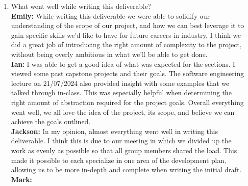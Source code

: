 \documentclass{article}
\begin{document}



\begin{enumerate}
    \item What went well while writing this deliverable? \\
    \textbf{Emily:} While writing this deliverable we were able to solidify our understanding of the scope of our project, and how we can best leverage it to 
                    gain specific skills we’d like to have for future careers in industry. I think we did a great job of introducing the right amount of 
                    complexity to the project, without being overly ambitious in what we’ll be able to get done.\\
    \textbf{Ian:} I was able to get a good idea of what was expected for the sections. I viewed some past capstone projects and their goals. The software engineering 
                    lecture on 21/07/2024 also provided insight with some examples that we talked through in-class. This was especially helpful when determining the right amount of 
                    abstraction required for the project goals. Overall everything went well, we all love the idea of the project, its scope, and believe we can achieve the goals outlined.\\
    \textbf{Jackson:} In my opinion, almost everything went well in writing this deliverable. I think this is due to our meeting in which we divided up the work 
                    as evenly as possible so that all group members shared the load. This made it possible to each specialize in one area of the development plan, allowing us to 
                    be more in-depth and complete when writing the initial draft.\\
    \textbf{Mark:} \\


\end{enumerate}
\end{document}
